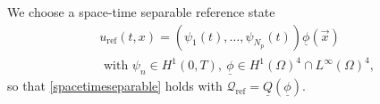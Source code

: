 \documentclass[12pt]{article}
\newcommand\skipgradient[1]{}
\newcommand\hrefprime{\mathcal{Q}_{\text{ref}}}
\newcommand\vecr{\vec{x}}
\newcommand\ulB{\underline{B}}
\newcommand\ulH{\underline{H}}
\newcommand\ulQ{\underline{Q}}
\newcommand\Ncont{N_p}
\begin{document}
\skipgradient{(In the setting \eqref{eqn:bloch-torrey-rot-defs-g0}, we just replace $\delta B^0$ by $\delta B^0+\text{id}\cdot\vec{g}_0$ in the definition of $\ulH(\theta)$ and $\vec{g}_n(t)$ by zero in the definition of $\ulB_n(t)$.)
}

We choose a space-time separable reference state 
\begin{equation}\label{uref_BT}
\begin{aligned}
&u_{\text{ref}}(t,x)=(\psi_1(t),\ldots,\psi_{\Ncont}(t))\underline{\phi}(\vecr)\\&\text{ with }\psi_n\in H^1(0,T), \ \underline{\phi}\in H^1(\Omega)^4\cap L^\infty(\Omega)^4, 
\end{aligned}
\end{equation}
so that \eqref{spacetimeseparable} holds with $\hrefprime =\ulQ(\underline{\phi})$.

\medskip
\end{document}
